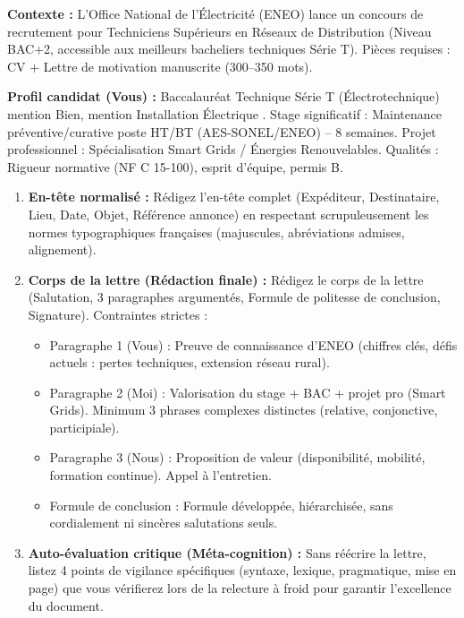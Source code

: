 \documentclass[11pt]{article}
\begin{document}
\begin{exercice}
\textbf{Contexte :} L'Office National de l'Électricité (ENEO) lance un concours de recrutement pour \og Techniciens Supérieurs en Réseaux de Distribution \fg{} (Niveau BAC+2, accessible aux meilleurs bacheliers techniques Série T). Pièces requises : CV + Lettre de motivation manuscrite (300--350 mots).

\textbf{Profil candidat (Vous) :} Baccalauréat Technique Série T (Électrotechnique) mention Bien, mention \og Installation Électrique \fg{}. Stage significatif : Maintenance préventive/curative poste HT/BT (AES-SONEL/ENEO) -- 8 semaines. Projet professionnel : Spécialisation Smart Grids / Énergies Renouvelables. Qualités : Rigueur normative (NF C 15-100), esprit d'équipe, permis B.

\begin{enumerate}
    \item \textbf{En-tête normalisé :} Rédigez l'en-tête complet (Expéditeur, Destinataire, Lieu, Date, Objet, Référence annonce) en respectant scrupuleusement les normes typographiques françaises (majuscules, abréviations admises, alignement).
    \item \textbf{Corps de la lettre (Rédaction finale) :} Rédigez le corps de la lettre (Salutation, 3 paragraphes argumentés, Formule de politesse de conclusion, Signature). Contraintes strictes :
    \begin{itemize}
        \item Paragraphe 1 (Vous) : Preuve de connaissance d'ENEO (chiffres clés, défis actuels : pertes techniques, extension réseau rural).
        \item Paragraphe 2 (Moi) : Valorisation du stage + BAC + projet pro (Smart Grids). Minimum 3 phrases complexes distinctes (relative, conjonctive, participiale).
        \item Paragraphe 3 (Nous) : Proposition de valeur (disponibilité, mobilité, formation continue). Appel à l'entretien.
        \item Formule de conclusion : Formule développée, hiérarchisée, sans \og cordialement \fg{} ni \og sincères salutations \fg{} seuls.
    \end{itemize}
    \item \textbf{Auto-évaluation critique (Méta-cognition) :} Sans réécrire la lettre, listez 4 points de vigilance spécifiques (syntaxe, lexique, pragmatique, mise en page) que vous vérifierez lors de la relecture \og à froid \fg{} pour garantir l'excellence du document.
\end{enumerate}
\end{exercice}
\end{document}
